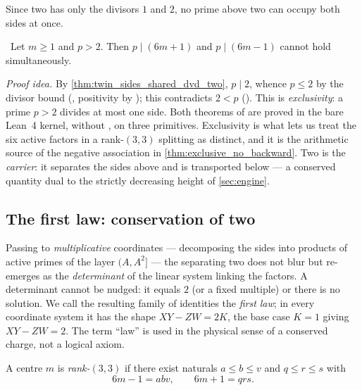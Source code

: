 Since two has only the divisors $1$ and $2$, no prime above two can occupy both sides at once.

\begin{theorem}\label{thm:no_large_shared_divisor}
\green{}\ Let $m\ge 1$ and $p>2$. Then $p\mid(6m+1)$ and $p\mid(6m-1)$ cannot hold simultaneously.
\end{theorem}

\emph{Proof idea.} By \cref{thm:twin_sides_shared_dvd_two}, $p\mid 2$, whence $p\le 2$ by the
divisor bound (, positivity by ); this contradicts $2<p$
(). This is \emph{exclusivity}: a prime $p>2$ divides at most one side. Both theorems of
 are proved in the bare Lean~4 kernel, without , on three
primitives. Exclusivity is what lets us treat the six active factors in a rank-$(3,3)$ splitting as
distinct, and it is the arithmetic source of the negative association in
\cref{thm:exclusive_no_backward}. Two is the \emph{carrier}: it separates the sides above and is
transported below --- a conserved quantity dual to the strictly decreasing height of
\cref{sec:engine}.

\subsection{The first law: conservation of two}

Passing to \emph{multiplicative} coordinates --- decomposing the sides into products of active
primes of the layer $(A,A^2]$ --- the separating two does not blur but re-emerges as the
\emph{determinant} of the linear system linking the factors. A determinant cannot be nudged: it
equals $2$ (or a fixed multiple) or there is no solution. We call the resulting family of identities
the \emph{first law}; in every coordinate system it has the shape $XY-ZW=2K$, the base case $K=1$
giving $XY-ZW=2$. The term ``law'' is used in the physical sense of a conserved charge, not a
logical axiom.

\begin{definition}\label{def:rank33}
A centre $m$ is \emph{rank-$(3,3)$} if there exist naturals $a\le b\le v$ and $q\le r\le s$ with
\begin{equation}\label{eq:rank33}
6m-1=abv,\qquad 6m+1=qrs.
\end{equation}
\end{definition}


